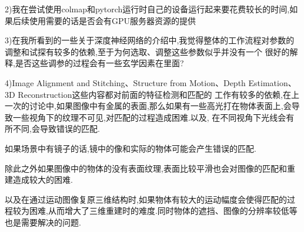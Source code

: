 \documentclass{article}
\begin{document}
2)我在尝试使用colmap和pytorch运行时自己的设备运行起来要花费较长的时间,如果后续使用需要的话是否会有GPU服务器资源的提供

3)在我所看到的一些关于深度神经网络的介绍中,我觉得整体的工作流程对参数的调整和试探有较多的依赖,至于为何选取、调整这些参数似乎并没有一个
很好的解释,是否这些调参的过程会有一些玄学因素在里面?

4)Image Alignment and Stitching、Structure from Motion、Depth Estimation、3D Reconstruction这些内容都对前面的特征检测和匹配的
工作有较多的依赖,在上一次的讨论中,如果图像中有金属的表面,那么如果有一些高光打在物体表面上,会导致一些视角下的纹理不可见,对匹配的过程造成困难.以及,
在不同视角下光线会有所不同,会导致错误的匹配.

如果场景中有镜子的话,镜中的像和实际的物体可能会产生错误的匹配.

除此之外如果图像中的物体的没有表面纹理,表面比较平滑也会对图像的匹配和重建造成较大的困难.

以及在通过运动图像复原三维结构时,如果物体有较大的运动幅度会使得匹配的过程较为困难,从而增大了三维重建时的难度.同时物体的遮挡、图像的分辨率较低等也是需要解决的问题.
\end{document}
